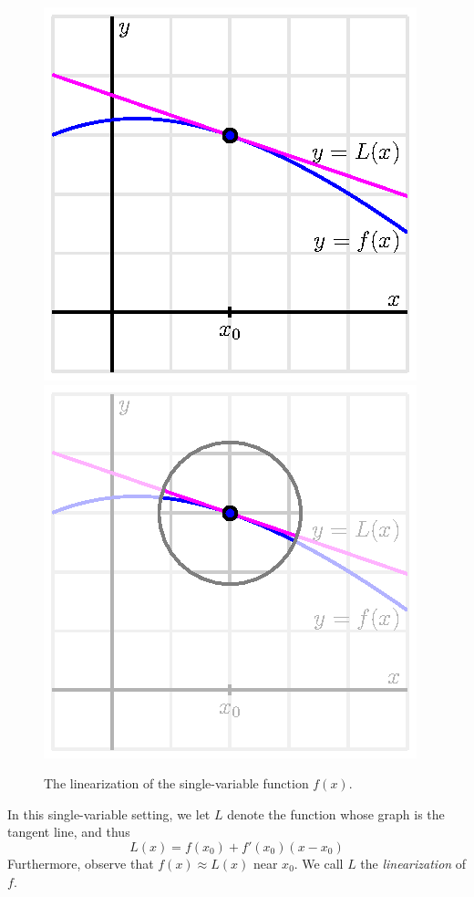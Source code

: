 \begin{figure}[ht]
  \begin{center}
    \includegraphics{figures/fig_10_4_2d_linear.eps}
    \hspace*{20pt}
    \includegraphics{figures/fig_10_4_2d_linear_gray.eps}
  \end{center}
  \caption{The linearization of the single-variable function $f(x)$.}
  \label{F:10.4.2d.linear}
\end{figure}

In this single-variable setting, we let $L$ denote the function whose graph is the tangent line, and thus
$$
L(x) = f(x_0) + f'(x_0)(x-x_0)
$$
Furthermore, observe that $f(x) \approx L(x)$ near $x_0$.  We call $L$ the
{\em linearization} of $f$.

